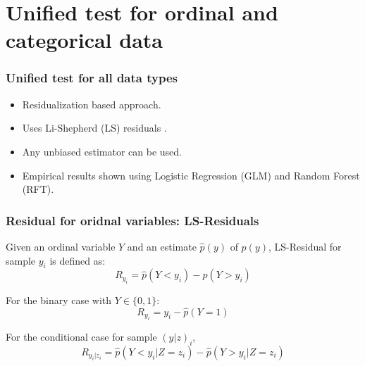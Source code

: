 \documentclass{beamer}
\begin{document}
\section{Unified test for ordinal and categorical data}
\begin{frame}
	\frametitle{Unified test for all data types}
	\begin{itemize}
		\setlength\itemsep{1em}
		\item Residualization based approach.
		\item Uses Li-Shepherd (LS) residuals \footnotemark.
		\item Any unbiased estimator can be used.
		\item Empirical results shown using Logistic Regression (GLM) and Random Forest (RFT).
	\end{itemize}
\end{frame}


\begin{frame}
	\frametitle{Residual for oridnal variables: LS-Residuals}
	Given an ordinal variable $ Y $ and an estimate $ \hat{p}(y) $ of $
	p(y) $, LS-Residual for sample $ y_i $ is defined as:
	$$ R_{y_i} = \hat{p}(Y < y_i) - \hat{p}(Y > y_i) $$
	\vspace{1em}

	For the binary case with $ Y \in \{0, 1\} $:
	$$ R_{y_i} = y_i - \hat{p}(Y = 1) $$
	\vspace{1em}

	For the conditional case for sample $ (y|z)_i $,
	$$ R_{y_i | z_i} = \hat{p}(Y < y_i | Z=z_i) - \hat{p}(Y>y_i|Z=z_i) $$

\end{frame}
\end{document}
